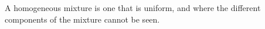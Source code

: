 \label{m38708*fhsst!!!underscore!!!id96} { \label{m38708*meaningfhsst!!!underscore!!!id96}
        A homogeneous mixture is one that is uniform, and where the different components of the mixture cannot be seen. 
         } 
\vspace{-2cm}
\label{m38708*eip-479}
